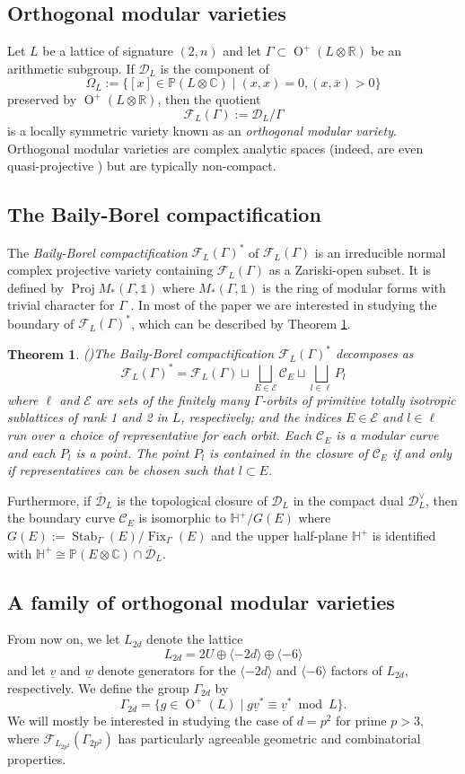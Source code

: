 \documentclass[11pt]{article}
\newtheorem{thm}{Theorem}[section]
\newcommand{\RR}{\mathbb{R}}
\newcommand{\CC}{\mathbb{C}}
\newcommand{\PP}{\mathbb{P}}
\newcommand{\HH}{\mathbb{H}}
\newcommand{\cc}{\mathcal{C}}
\newcommand{\dc}{\mathcal{D}}
\newcommand{\ec}{\mathcal{E}}
\newcommand{\fc}{\mathcal{F}}
\newcommand{\la}{\langle}
\newcommand{\ra}{\rangle}
\newcommand{\opn}{\operatorname}
\newcommand{\op}{\oplus}
\newcommand{\beq}{\begin{equation*}}
\newcommand{\eeq}{\end{equation*}}
\begin{document}
\subsection{Orthogonal modular varieties}
Let $L$ be a lattice of signature $(2,n)$ and let $\Gamma \subset \opn{O}^+(L \otimes \RR)$ be an arithmetic subgroup.
If $\dc_L$ is the component of
\beq
\Omega_L := \{ [x] \in \PP(L \otimes \CC) \mid (x,x)=0, (x, \overline{x})>0 \}
\eeq
preserved by $\opn{O}^+(L \otimes \RR)$, then the quotient
\beq
\fc_L(\Gamma) := \dc_L / \Gamma
\eeq
is a locally symmetric variety known as an \emph{orthogonal modular variety}.
Orthogonal modular varieties are complex analytic spaces (indeed, are even quasi-projective \cite{bailyborel}) but are typically non-compact.
\subsection{The Baily-Borel compactification}
The \emph{Baily-Borel compactification} $\fc_L(\Gamma)^*$ of  $\fc_L(\Gamma)$ is an irreducible normal complex projective variety containing $\fc_L(\Gamma)$ as a Zariski-open subset.
It is defined by $\opn{Proj} M_*(\Gamma, \mathds{1})$ where $M_*(\Gamma, \mathds{1})$  is the ring of modular forms with trivial character for $\Gamma$ \cite{bailyborel}.
In most of the paper we are interested in studying the boundary of $\fc_L(\Gamma)^*$, which can be described by Theorem \ref{bbdec}.
\begin{thm}{(\cite{handbook})}\label{bbdec}
  The Baily-Borel compactification $\fc_L(\Gamma)^*$  decomposes  as
  \beq
  \fc_L(\Gamma)^* =
  \fc_L(\Gamma)
  \sqcup \bigsqcup_{E \in \ec} \cc_E
  \sqcup \bigsqcup_{l \in \ell} P_l
  \eeq
  where $\ell$ and $\ec$ are sets of the finitely many $\Gamma$-orbits of primitive totally isotropic sublattices of rank 1 and 2 in $L$, respectively; and  the indices $E \in \ec$ and $l \in \ell$ run over a choice of representative for each orbit.
  Each $\cc_E$ is a modular curve and each $P_l$ is a point.
  The point $P_l$ is contained in the closure of $\cc_E$ if and only if representatives can be chosen such that $l \subset E$.
\end{thm}
Furthermore, if $\overline{\dc}_L$ is the topological closure of $\dc_L$ in the compact dual $\dc_L^{\vee}$, then the boundary curve $\cc_E$ is isomorphic to $\HH^+/G(E)$ where  $G(E) := \opn{Stab}_{\Gamma}(E) / \opn{Fix}_{\Gamma}(E)$ and the upper half-plane $\HH^+$ is identified with $\HH^+ \cong \PP(E \otimes \CC) \cap \overline{\dc}_L$.
\subsection{A family of orthogonal modular varieties}\label{famiglia}
From now on, we let $L_{2d}$ denote the lattice
\beq
L_{2d} = 2U \op \la -2d \ra \op \la -6 \ra
\eeq
and let $\underline{v}$ and $\underline{w}$ denote generators for the $\la -2d \ra$ and $\la -6 \ra$ factors of $L_{2d}$, respectively.
We define the group $\Gamma_{2d}$ by
\beq
\Gamma_{2d} = \{ g \in \opn{O}^+(L) \mid g \underline{v}^* \equiv \underline{v}^* \bmod{ L} \}.
\eeq
We will mostly be interested in studying the case of $d=p^2$ for prime $p>3$, where $\fc_{L_{2p^2}}(\Gamma_{2p^2})$ has particularly agreeable geometric and combinatorial properties.
\end{document}
